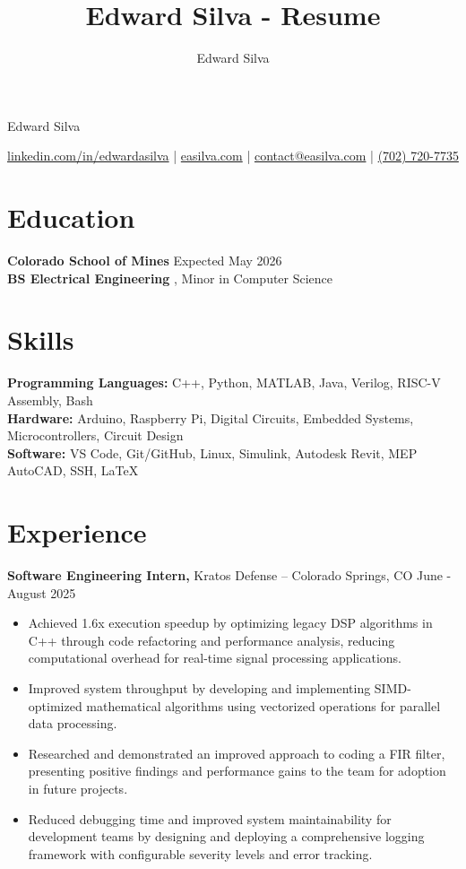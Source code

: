 \documentclass[11pt]{article}
\title{Edward Silva - Resume}
\author{Edward Silva}
\begin{document}
\thispagestyle{empty}

\centerline{\huge Edward Silva}
\vspace{3pt}

\centerline{\href{https://www.linkedin.com/in/edwardasilva}{linkedin.com/in/edwardasilva} | \href{https://easilva.com}{easilva.com} | \href{mailto:contact@easilva.com}{contact@easilva.com} | \href{tel:7027207735}{(702) 720-7735}}

\section*{Education}

\textbf{Colorado School of Mines} \hfill Expected May 2026 \\
\textbf{BS Electrical Engineering} , Minor in Computer Science \\



\section*{Skills}

\textbf{Programming Languages:} C++, Python, MATLAB, Java, Verilog, RISC-V Assembly, Bash \\
\textbf{Hardware:} Arduino, Raspberry Pi, Digital Circuits, Embedded Systems, Microcontrollers, Circuit Design \\
\textbf{Software:} VS Code, Git/GitHub, Linux, Simulink, Autodesk Revit, MEP AutoCAD, SSH, LaTeX \\

\section*{Experience}

\textbf{Software Engineering Intern, }{Kratos Defense} -- Colorado Springs, CO \hfill June - August 2025 \\
\begin{itemize}
  \item Achieved 1.6x execution speedup by optimizing legacy DSP algorithms in C++ through code refactoring and performance analysis, reducing computational overhead for real-time signal processing applications.
  \item Improved system throughput by developing and implementing SIMD-optimized mathematical algorithms using vectorized operations for parallel data processing.
  \item Researched and demonstrated an improved approach to coding a FIR filter, presenting positive findings and performance gains to the team for adoption in future projects.
  \item Reduced debugging time and improved system maintainability for development teams by designing and deploying a comprehensive logging framework with configurable severity levels and error tracking.
\end{itemize}
\end{document}
